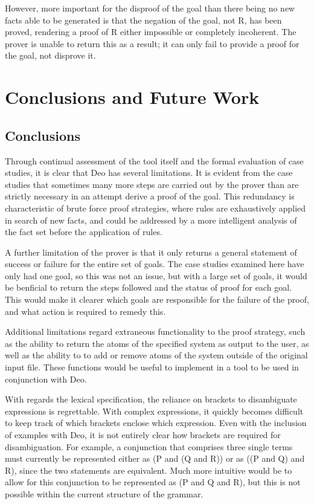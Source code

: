 \documentclass{l4proj}
\begin{document}
However, more important for the disproof of the goal than there being no new facts able to be generated is that the negation of the goal, not R, has been proved, rendering a proof of R either impossible or completely incoherent. The prover is unable to return this as a result; it can only fail to provide a proof for the goal, not disprove it. 

\chapter{Conclusions and Future Work}

\section{Conclusions}
Through continual assessment of the tool itself and the formal evaluation of case studies, it is clear that Deo has several limitations. It is evident from the case studies that sometimes many more steps are carried out by the prover than are strictly necessary in an attempt derive a proof of the goal. This redundancy is characteristic of brute force proof strategies, where rules are exhaustively applied in search of new facts, and could be addressed by a more intelligent analysis of the fact set before the application of rules. 

A further limitation of the prover is that it only returns a general statement of success or failure for the entire set of goals. The case studies examined here have only had one goal, so this was not an issue, but with a large set of goals, it would be benficial to return the steps followed and the status of proof for each goal. This would make it clearer which goals are responsible for the failure of the proof, and what action is required to remedy this. 

Additional limitations regard extraneous functionality to the proof strategy, such as the ability to return the atoms of the specified system as output to the user, as well as the ability to to add or remove atoms of the system outside of the original input file. These functions would be useful to implement in a tool to be used in conjunction with Deo. 

With regards the lexical specification, the reliance on brackets to disambiguate expressions is regrettable. With complex expressions, it quickly becomes difficult to keep track of which brackets enclose which expression. Even with the inclusion of examples with Deo, it is not entirely clear how brackets are required for disambiguation. For example, a conjunction that comprises three single terms must currently be represented either as (P and (Q and R)) or as ((P and Q) and R), since the two statements are equivalent. Much more intuitive would be to allow for this conjunction to be represented as (P and Q and R), but this is not possible within the current structure of the grammar. 
\end{document}
